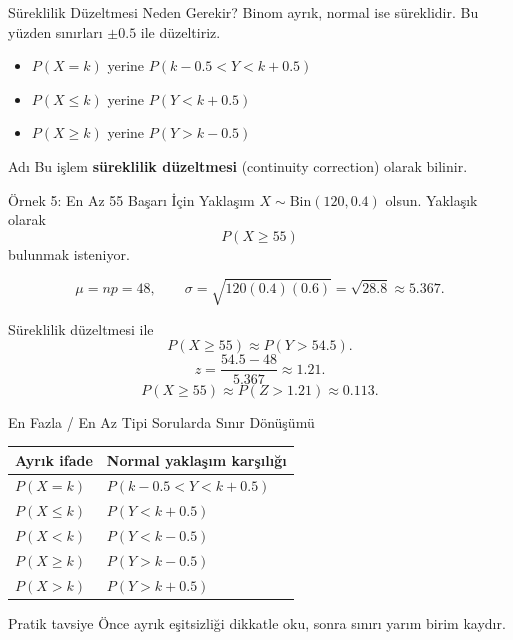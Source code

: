 \documentclass[light]{lutbeamer}
\begin{document}
\begin{frame}{Süreklilik Düzeltmesi Neden Gerekir?}
    \small
    Binom ayrık, normal ise süreklidir. Bu yüzden sınırları \(\pm 0.5\) ile düzeltiriz.

    \begin{itemize}
        \item \(P(X=k)\) yerine \(P(k-0.5<Y<k+0.5)\)
        \item \(P(X\le k)\) yerine \(P(Y<k+0.5)\)
        \item \(P(X\ge k)\) yerine \(P(Y>k-0.5)\)
    \end{itemize}

    \begin{alertblock}{Adı}
        Bu işlem \textbf{süreklilik düzeltmesi} (continuity correction) olarak bilinir.
    \end{alertblock}
\end{frame}

\begin{frame}{Örnek 5: En Az 55 Başarı İçin Yaklaşım}
    \small
    \(X \sim \mathrm{Bin}(120,0.4)\) olsun. Yaklaşık olarak
    \[
    P(X\ge 55)
    \]
    bulunmak isteniyor.

    \[
    \mu=np=48, \qquad \sigma=\sqrt{120(0.4)(0.6)}=\sqrt{28.8}\approx 5.367.
    \]

    Süreklilik düzeltmesi ile
    \[
    P(X\ge 55)\approx P(Y>54.5).
    \]
    \[
    z=\frac{54.5-48}{5.367}\approx 1.21.
    \]
    \[
    P(X\ge 55)\approx P(Z>1.21)\approx 0.113.
    \]
\end{frame}

\begin{frame}{En Fazla / En Az Tipi Sorularda Sınır Dönüşümü}
    \small
    \begin{center}
        \begin{tabular}{@{}ll@{}}
            \toprule
            \textbf{Ayrık ifade} & \textbf{Normal yaklaşım karşılığı} \\ \midrule
            \(P(X=k)\) & \(P(k-0.5<Y<k+0.5)\) \\
            \(P(X\le k)\) & \(P(Y<k+0.5)\) \\
            \(P(X<k)\) & \(P(Y<k-0.5)\) \\
            \(P(X\ge k)\) & \(P(Y>k-0.5)\) \\
            \(P(X>k)\) & \(P(Y>k+0.5)\) \\ \bottomrule
        \end{tabular}
    \end{center}

    \begin{alertblock}{Pratik tavsiye}
        Önce ayrık eşitsizliği dikkatle oku, sonra sınırı yarım birim kaydır.
    \end{alertblock}
\end{frame}
\end{document}
